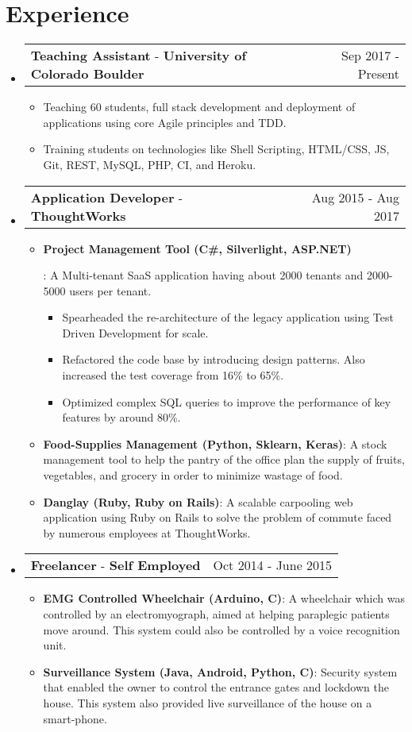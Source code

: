 \documentclass[letterpaper,11pt]{article}
\makeatletter
\newcommand{\resumeItem}[2]{
  \linespread{1.1}
  \item\small{
      \textbf{#1}{: #2}
    }
}
\newcommand{\resumePoint}[1]{
  \linespread{1.2}
  \item\small{#1}
}
\newcommand{\resumeExperienceSubheading}[5]{
  \vspace{-3pt}\item
    \begin{tabular*}{0.97\textwidth}{l@{\extracolsep{\fill}}r}
      \textbf{#1} \normalfont{\small#2} - \textbf{#3}\normalfont{#4} & #5 \\
    \end{tabular*}\vspace{-4pt}
}
\newcommand{\resumeSubHeadingListStart}{\begin{itemize}[leftmargin=*]}
\newcommand{\resumeSubHeadingListEnd}{\end{itemize}\vspace{-14pt}}
\newcommand{\resumeItemListStart}{\begin{itemize}}
\newcommand{\resumeItemListEnd}{\end{itemize}\vspace{-2pt}}
\newcommand{\resumeInnerItemListStart}{\begin{itemize}\vspace{-1pt}}
\newcommand{\resumeInnerItemListEnd}{\end{itemize}\vspace{2pt}}
\makeatother
\begin{document}

\section{Experience}
  \resumeSubHeadingListStart
    \resumeExperienceSubheading
      {Teaching Assistant}{\href{https://www.colorado.edu/cs/csci-3308-software-development-methods-and-tools}{(S/W Dev Methods \& Tools)}}{University of Colorado Boulder}{}{Sep 2017 - Present}
      \resumeItemListStart
          \resumePoint{Teaching 60 students, full stack development and deployment of applications using core Agile principles and TDD.}
          \resumePoint{Training students on technologies like Shell Scripting, HTML/CSS, JS, Git, REST, MySQL, PHP, CI, and Heroku.}
      \resumeItemListEnd
    \resumeExperienceSubheading
      {Application Developer}{}{ThoughtWorks}{, Bangalore, India}{Aug 2015 - Aug 2017}
      \resumeItemListStart
      \resumeItem {Project Management Tool (C\#, Silverlight, ASP.NET)}
          {A Multi-tenant SaaS application having about 2000 tenants and 2000-5000 users per tenant.
          \resumeInnerItemListStart
            \resumePoint {Spearheaded the re-architecture of the legacy application using Test Driven Development for scale.}
            \resumePoint {Refactored the code base by introducing design patterns. Also increased the test coverage from 16\% to 65\%.}
            \resumePoint {Optimized complex SQL queries to improve the performance of key features by around 80\%.}
          \resumeInnerItemListEnd}
        \resumeItem {Food-Supplies Management (Python, Sklearn, Keras)}{A stock management tool to help the pantry of the office plan the supply of fruits, vegetables, and grocery in order to minimize wastage of food.}
      \resumeItem {Danglay (Ruby, Ruby on Rails)}{A scalable carpooling web application using Ruby on Rails to solve the problem of commute faced by numerous employees at ThoughtWorks.}
      \resumeItemListEnd
    \resumeExperienceSubheading
      {Freelancer}{(Embedded System Prototyping)}{Self Employed}{, Bangalore, India}{Oct 2014 - June 2015}
      \resumeItemListStart
          \resumeItem{EMG Controlled Wheelchair (Arduino, C)}{A wheelchair which was controlled by an electromyograph, aimed at helping paraplegic patients move around. This system could also be controlled by a voice recognition unit.}
          \resumeItem{Surveillance System (Java, Android, Python, C)}{Security system that enabled the owner to control the entrance gates and lockdown the house. This system also provided live surveillance of the house on a smart-phone.}
      \resumeItemListEnd
  \resumeSubHeadingListEnd
\end{document}
